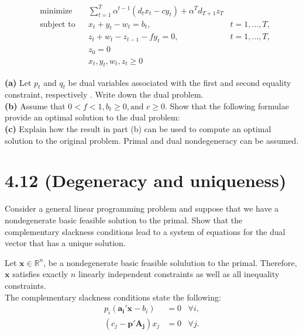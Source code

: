 \documentclass{article}
\begin{document}
\begin{equation*}
\begin{aligned}
& \text{minimize} && \displaystyle \sum_{t=1}^T \alpha^{t-1} (d_t x_t - c y_t) + \alpha^T d_{T+1} z_T\\
& \text{subject to} && x_t + y_t - w_t = b_t, \; & t = 1, \dots, T, \\
&&& z_t + w_t - z_{t-1} - fy_t = 0, & t = 1, \dots, T, \\
&&& z_0 = 0 \\
&&& x_t, y_t, w_t, z_t \geq 0
\end{aligned}
\end{equation*}

\noindent \textbf{(a)} Let $p_t$ and $q_t$ be dual variables associated with the first and second equality constraint, respectively .  Write down the dual problem. \\

\noindent \textbf{(b)} Assume that $ 0 < f < 1, b_t \geq 0, \text{and } c \geq 0$.  Show that the following formulae provide an optimal solution to the dual problem: \\

\noindent \textbf{(c)} Explain how the result in part (b) can be used to compute an optimal solution to the original problem.  Primal and dual nondegeneracy can be assumed. \\



\section*{4.12 (Degeneracy and uniqueness)}
Consider a general linear programming problem and suppose that we have a nondegenerate basic feasible solution to the primal.  Show that the complementary slackness conditions lead to a system of equations for the dual vector that has a unique solution.\\

\noindent

Let $\mathbf{x} \in \mathbb{R}^n$, be a nondegenerate basic feasible solulution to the primal.  Therefore, $\mathbf{x}$ satisfies exactly $n$ linearly independent constraints as well as all inequality constraints.\\

The complementary slackness conditions state the following:\\

\begin{equation*}
\begin{aligned}
p_i (\mathbf{a_i'x} - b_i) & = 0 \; \; \; \forall i, \\
(c_j - \mathbf{p' A_j}) x_j & = 0 \; \; \; \forall j.
\end{aligned}
\end{equation*}
\end{document}
